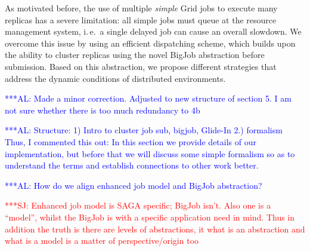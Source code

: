 \documentclass{rspublic}
\newcommand{\alnote}[1]{ {\textcolor{blue} { ***AL: #1 }}}
\newcommand{\jhanote}[1]{ {\textcolor{red} { ***SJ: #1 }}}
\newcommand{\alnote}[1]{}
\newcommand{\jhanote}[1]{}
\newcommand{\I}[1]{\textit{#1}}
\begin{document}
As motivated before, the use of multiple {\it simple} Grid jobs to
execute many replicas has a severe limitation: all simple jobs must
queue at the resource management system, i.\,e.\ a single delayed
job can cause an overall slowdown.  We overcome
this issue by using an efficient dispatching scheme, which builds upon
the ability to cluster replicas using the novel BigJob abstraction
before submission. Based on this abstraction, we propose different
strategies that address the dynamic conditions of distributed
environments.

\alnote{Made a minor correction. Adjusted to new structure of section
  5. I am not sure whether there is too much redundancy to 4b}

\alnote{Structure: 1) Intro to cluster job sub, bigjob, Glide-In 2.)
  formalism Thus, I commented this out: In this section we provide
  details of our implementation, but before that we will discuss some
  simple formalism so as to understand the terms and establish
  connections to other work better.  }

\alnote{How do we align enhanced job model and BigJob abstraction?}

\jhanote{Enhanced job model is SAGA specific; BigJob isn't. Also one
  is a ``model'', whilst the BigJob is with a specific application
  need in mind. Thus in addition the truth is there are levels of
  abstractions, it what is an abstraction and what is a model is a
  matter of perspective/origin too}              

\end{document}
